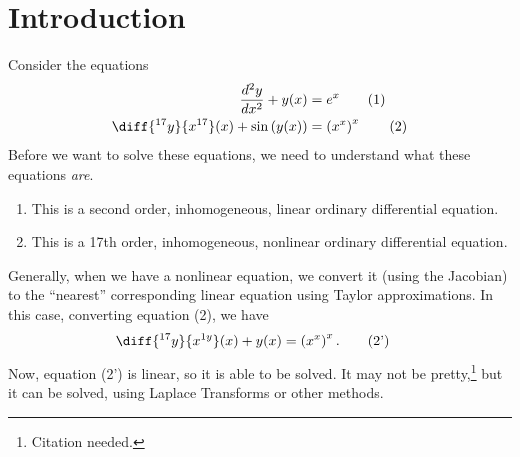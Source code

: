 \documentclass[10pt]{mypackage}
\begin{document}
\renewcommand{\arraystretch}{1.5}
\RaggedRight
\section{Introduction}%
Consider the equations
\begin{align*}
  \frac{d^2y}{dx^2} + y(x) &= e^x\tag*{(1)}\\
  \diff{^{17}y}{x^{17}}(x) + \sin\left(y(x)\right) &= \left(x^{x}\right)^{x}\tag*{(2)}
\end{align*}
Before we want to solve these equations, we need to understand what these equations \textit{are}. 
\begin{enumerate}[(1)]
  \item This is a second order, inhomogeneous, linear ordinary differential equation.
  \item This is a 17th order, inhomogeneous, nonlinear ordinary differential equation.
\end{enumerate}
Generally, when we have a nonlinear equation, we convert it (using the Jacobian) to the ``nearest'' corresponding linear equation using Taylor approximations. In this case, converting equation (2), we have
\begin{align*}
  \diff{^{17}y}{x^{1y}}(x) + y(x) &= \left(x^{x}\right)^{x}.\tag*{(2')}
\end{align*}
Now, equation (2') is linear, so it is able to be solved. It may not be pretty,\footnote{Citation needed.} but it can be solved, using Laplace Transforms or other methods.
\end{document}
